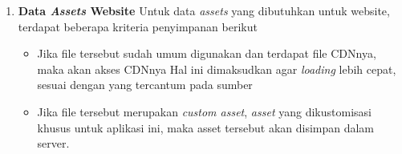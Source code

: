 \begin{enumerate}
    \item \textbf{Data \textit{Assets} Website}
    \newline
    \indent Untuk data \textit{assets} yang dibutuhkan untuk website, terdapat beberapa kriteria penyimpanan berikut
    
      \begin{itemize}[noitemsep,topsep=0pt]
      \item Jika file tersebut sudah umum digunakan dan terdapat file CDNnya, maka akan akses CDNnya
      \newline
      Hal ini dimaksudkan agar \textit{loading} lebih cepat, sesuai dengan yang tercantum pada sumber \cite{sitepoint_7_2011}
      \item Jika file tersebut merupakan \textit{custom asset}, \textit{asset} yang dikustomisasi khusus untuk aplikasi ini, maka asset tersebut akan disimpan dalam server.
      \end{itemize}
    
    \end{enumerate}
    
    \pagebreak